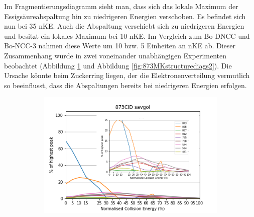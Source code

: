 Im Fragmentierungsdiagramm sieht man, dass sich das lokale Maximum der Essigsäureabspaltung hin zu niedrigeren Energien verschoben. Es befindet sich nun bei  35 \gls{nKE}. Auch die  Abspaltung verschiebt sich zu niedrigeren Energien und besitzt ein lokales Maximum bei 10 \gls{nKE}. Im Vergleich zum Bo-DNCC und Bo-NCC-3 nahmen diese Werte um 10 bzw. 5 Einheiten an \gls{nKE} ab. Dieser Zusammenhang wurde in zwei voneinander unabhängigen Experimenten beobachtet (Abbildung \ref{fig:873MKLeafspraydiags1} und Abbildung \ref{fig:873MKstructurediags2}). Die Ursache könnte beim Zuckerring liegen, der die Elektronenverteilung vermutlich so beeinflusst, dass die Abspaltungen bereits bei niedrigeren Energien erfolgen. 

\begin{figure}[!htbp]
  \begin{subfigure}[b]{0.5\textwidth}
    \includegraphics[width=\textwidth, height=\textwidth]{figures/Kapitel4/Kataboliten/diags/873CID-savgol1.png}
    \caption{}
    \label{fig:873MKLeafspraydiags1}
  \end{subfigure}
  \hfill
  \begin{subfigure}[b]{0.5\textwidth}

\end{subfigure}
\end{figure}

